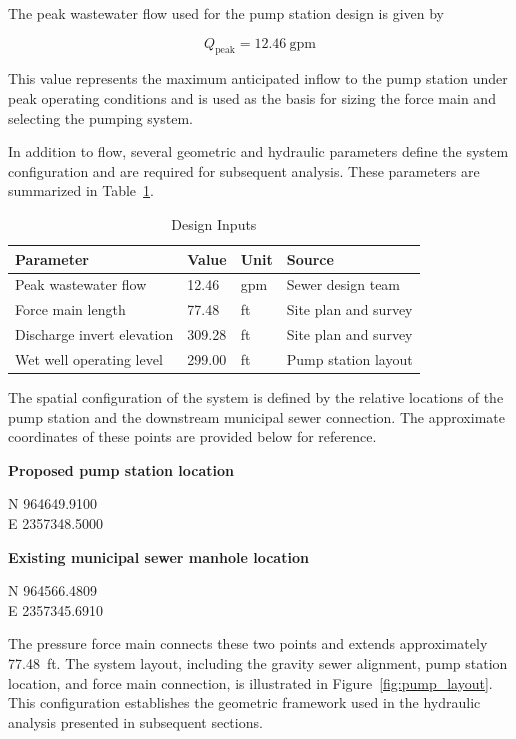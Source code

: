 The peak wastewater flow used for the pump station design is given by

\[
Q_{\text{peak}} = 12.46 \ \text{gpm}
\]

This value represents the maximum anticipated inflow to the pump station under peak operating conditions and is used as the basis for sizing the force main and selecting the pumping system.

In addition to flow, several geometric and hydraulic parameters define the system configuration and are required for subsequent analysis. These parameters are summarized in Table~\ref{tab:design_inputs}.

\begin{table}[H]
\centering
\caption{Design Inputs}
\label{tab:design_inputs}
\begin{tabular}{llll}
\toprule
\textbf{Parameter} & \textbf{Value} & \textbf{Unit} & \textbf{Source} \\
\midrule
Peak wastewater flow & 12.46 & gpm & Sewer design team \\
Force main length & 77.48 & ft & Site plan and survey \\
Discharge invert elevation & 309.28 & ft & Site plan and survey \\
Wet well operating level & 299.00 & ft & Pump station layout \\
\bottomrule
\end{tabular}
\end{table}

The spatial configuration of the system is defined by the relative locations of the pump station and the downstream municipal sewer connection. The approximate coordinates of these points are provided below for reference.

\textbf{Proposed pump station location}

N 964649.9100 \\
E 2357348.5000

\textbf{Existing municipal sewer manhole location}

N 964566.4809 \\
E 2357345.6910

The pressure force main connects these two points and extends approximately 77.48~ft. The system layout, including the gravity sewer alignment, pump station location, and force main connection, is illustrated in Figure~\ref{fig:pump_layout}. This configuration establishes the geometric framework used in the hydraulic analysis presented in subsequent sections.


